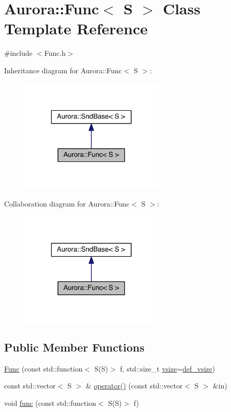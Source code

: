 \hypertarget{class_aurora_1_1_func}{}\section{Aurora\+:\+:Func$<$ S $>$ Class Template Reference}
\label{class_aurora_1_1_func}


{\ttfamily \#include $<$Func.\+h$>$}



Inheritance diagram for Aurora\+:\+:Func$<$ S $>$\+:\nopagebreak
\begin{figure}[H]
\begin{center}
\leavevmode
\includegraphics[width=196pt]{class_aurora_1_1_func__inherit__graph}
\end{center}
\end{figure}


Collaboration diagram for Aurora\+:\+:Func$<$ S $>$\+:\nopagebreak
\begin{figure}[H]
\begin{center}
\leavevmode
\includegraphics[width=196pt]{class_aurora_1_1_func__coll__graph}
\end{center}
\end{figure}
\subsection*{Public Member Functions}
\begin{DoxyCompactItemize}
\item 
\hyperlink{class_aurora_1_1_func_aca7dd7976ed6205103f2775b61706c0f}{Func} (const std\+::function$<$ S(S)$>$ f, std\+::size\+\_\+t \hyperlink{class_aurora_1_1_snd_base_af9e21aaf411b17f7a8221c991ce5d291}{vsize}=\hyperlink{namespace_aurora_afaaddf667a06e7ce23c667a8b7295263}{def\+\_\+vsize})
\item 
const std\+::vector$<$ S $>$ \& \hyperlink{class_aurora_1_1_func_a60e9dad421d80a9f9eb99cfbac104729}{operator()} (const std\+::vector$<$ S $>$ \&in)
\item 
void \hyperlink{class_aurora_1_1_func_ad0b316fc635de73ddcd75f97293c10d9}{func} (const std\+::function$<$ S(S)$>$ f)
\end{DoxyCompactItemize}
